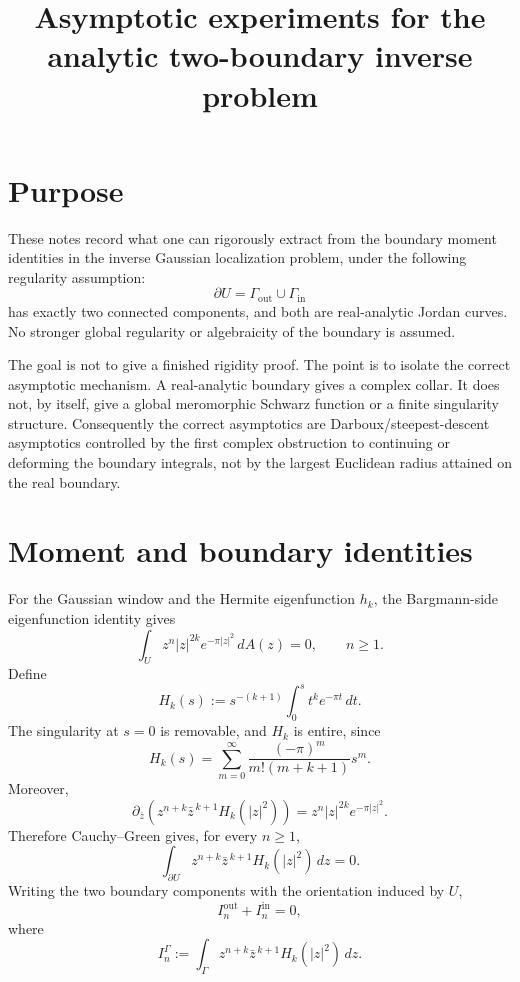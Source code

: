 \documentclass[11pt]{article}
\title{Asymptotic experiments for the analytic two-boundary inverse problem}
\author{}
\date{}
\newcommand{\dd}{\,d}
\newcommand{\pbar}{\partial_{\bar z}}
\newcommand{\1}{\mathbf 1}
\begin{document}
\maketitle

\section{Purpose}

These notes record what one can rigorously extract from the boundary moment identities in
the inverse Gaussian localization problem, under the following regularity assumption:
\[
  \partial U=\Gamma_{\mathrm{out}}\cup \Gamma_{\mathrm{in}}
\]
has exactly two connected components, and both are real-analytic Jordan curves. No
stronger global regularity or algebraicity of the boundary is assumed.

The goal is not to give a finished rigidity proof. The point is to isolate the correct
asymptotic mechanism. A real-analytic boundary gives a complex collar. It does not, by
itself, give a global meromorphic Schwarz function or a finite singularity structure.
Consequently the correct asymptotics are Darboux/steepest-descent asymptotics controlled
by the first complex obstruction to continuing or deforming the boundary integrals, not by
the largest Euclidean radius attained on the real boundary.

\section{Moment and boundary identities}

For the Gaussian window and the Hermite eigenfunction \(h_k\), the Bargmann-side
eigenfunction identity gives
\begin{equation}\label{eq:bulk-moments}
  \int_U z^n |z|^{2k}e^{-\pi |z|^2}\dd A(z)=0,
  \qquad n\ge 1.
\end{equation}
Define
\begin{equation}\label{eq:Hk-def}
  H_k(s):=s^{-(k+1)}\int_0^s t^k e^{-\pi t}\dd t .
\end{equation}
The singularity at \(s=0\) is removable, and \(H_k\) is entire, since
\[
  H_k(s)=\sum_{m=0}^\infty
  \frac{(-\pi)^m}{m!(m+k+1)}s^m .
\]
Moreover,
\[
  \pbar\!\left(z^{n+k}\bar z^{\,k+1}H_k(|z|^2)\right)
  =
  z^n |z|^{2k}e^{-\pi |z|^2}.
\]
Therefore Cauchy--Green gives, for every \(n\ge 1\),
\begin{equation}\label{eq:boundary-moments}
  \int_{\partial U} z^{n+k}\bar z^{\,k+1}H_k(|z|^2)\dd z=0.
\end{equation}
Writing the two boundary components with the orientation induced by \(U\),
\begin{equation}\label{eq:two-component-split}
  I_n^{\mathrm{out}}+I_n^{\mathrm{in}}=0,
\end{equation}
where
\begin{equation}\label{eq:component-integral}
  I_n^\Gamma
  :=
  \int_\Gamma z^{n+k}\bar z^{\,k+1}H_k(|z|^2)\dd z .
\end{equation}
\end{document}
